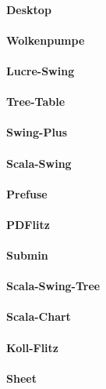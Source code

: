 \documentclass[11pt,a4paper]{article}
\begin{document}
\paragraph{Desktop}

\paragraph{Wolkenpumpe}

\paragraph{Lucre-Swing}

\paragraph{Tree-Table}

\paragraph{Swing-Plus}

\paragraph{Scala-Swing}

\paragraph{Prefuse}

\paragraph{PDFlitz}

\paragraph{Submin}

\paragraph{Scala-Swing-Tree}

\paragraph{Scala-Chart}

\paragraph{Koll-Flitz}

\paragraph{Sheet}

\printbibliography
\end{document}
